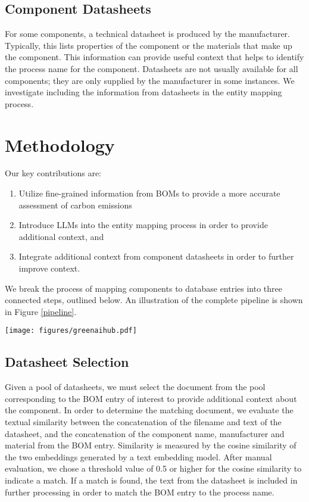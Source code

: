 \documentclass[11pt]{article}
\begin{document}


\subsection{Component Datasheets}

For some components, a technical datasheet is produced by the manufacturer. Typically, this lists properties of the component or the materials that make up the component. This information can provide useful context that helps to identify the process name for the component. Datasheets are not usually available for all components; they are only supplied by the manufacturer in some instances. We investigate including the information from datasheets in the entity mapping process. 


\section{Methodology}

Our key contributions are:
\begin{enumerate}
    \item Utilize fine-grained information from BOMs to provide a more accurate assessment of carbon emissions
    \item Introduce LLMs into the entity mapping process in order to provide additional context, and
    \item Integrate additional context from component datasheets in order to further improve context.
\end{enumerate}
We break the process of mapping components to database entries into three connected steps, outlined below. An illustration of the complete pipeline is shown in Figure \ref{pipeline}.

\begin{figure*}[h]
\centerline{\texttt{[image: figures/greenaihub.pdf]}}
\caption{Architecture of the proposed pipeline, made up of three modules: Document retrieval, LLM querying, and database ranking.}
\label{pipeline}
\end{figure*}


\subsection{Datasheet Selection}

Given a pool of datasheets, we must select the document from the pool corresponding to the BOM entry of interest to provide additional context about the component. In order to determine the matching document, we evaluate the textual similarity between the concatenation of the filename and text of the datasheet, and the concatenation of the component name, manufacturer and material from the BOM entry. Similarity is measured by the cosine similarity of the two embeddings generated by a text embedding model. After manual evaluation, we chose a threshold value of 0.5 or higher for the cosine similarity to indicate a match. If a match is found, the text from the datasheet is included in further processing in order to match the BOM entry to the process name.
\end{document}
